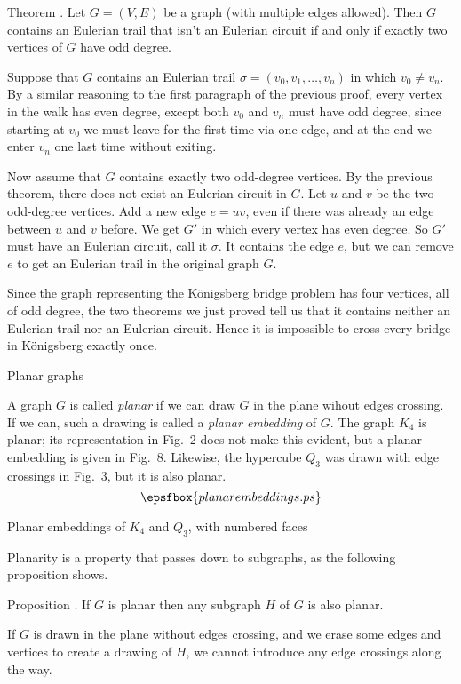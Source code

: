 \proclaim Theorem \advthm. Let $G = (V,E)$ be a graph (with multiple edges allowed). Then $G$ contains
an Eulerian trail that isn't an Eulerian circuit
if and only if exactly two vertices of $G$ have odd degree.

\proof Suppose that $G$ contains an Eulerian trail $\sigma = (v_0,v_1,\ldots,v_n)$
in which $v_0\ne v_n$. By a similar reasoning to the first paragraph of the previous proof,
every vertex in the walk has even degree, except both $v_0$ and $v_n$ must have odd degree,
since starting at $v_0$ we must leave for the first time via one edge, and at the end we enter $v_n$
one last time without exiting.

Now assume that $G$ contains exactly two odd-degree vertices. By the previous theorem, there does
not exist an Eulerian circuit in $G$. Let $u$ and $v$ be the two odd-degree vertices.
Add a new edge $e = uv$, even if there was already an edge between $u$ and $v$ before. We get $G'$ in
which every vertex has even degree. So $G'$ must have an Eulerian circuit, call it $\sigma$.
It contains the edge $e$, but we can remove $e$ to get an Eulerian trail in the original graph $G$.\slug

Since the graph representing the K\"onigsberg bridge problem has four vertices, all of odd degree,
the two theorems we just proved tell us that it contains neither an Eulerian trail nor an
Eulerian circuit. Hence it is impossible to cross every bridge in K\"onigsberg exactly once.

\advsect Planar graphs

 A graph $G$ is called {\it planar} if we can draw $G$ in the plane wihout edges
crossing. If we can, such a drawing is called a {\it planar embedding} of $G$.
The graph $K_4$ is planar; its representation in Fig.~2 does not make this evident, but
a planar embedding is given in Fig.~8. Likewise, the hypercube $Q_3$ was drawn with edge crossings
in Fig.~3, but it is also planar.
\midinsert
$$\epsfbox{planarembeddings.ps}$$
\vskip5pt
\caption{Planar embeddings of $K_4$ and $Q_3$, with numbered faces}
\endinsert
\goodbreak
Planarity is a property that passes down to subgraphs, as the following proposition shows.

\edef\propsubgraphplanar{\the\thmcount}
\proclaim Proposition \advthm. If $G$ is planar then any subgraph $H$ of $G$ is also planar.

\proof If $G$ is drawn in the plane without edges crossing, and we erase some edges and vertices
to create a drawing of $H$, we cannot introduce any edge crossings along the way.\slug

